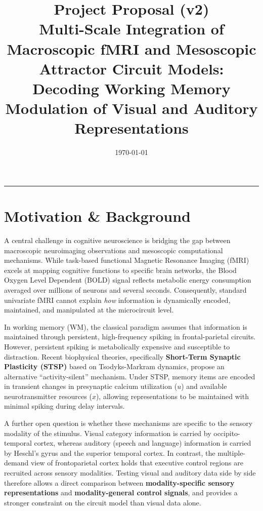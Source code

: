\documentclass[11pt,a4paper]{article}
\title{\textbf{Project Proposal (v2)}\\[0.5em] 
\Large Multi-Scale Integration of Macroscopic fMRI and Mesoscopic Attractor Circuit Models: Decoding Working Memory Modulation of Visual and Auditory Representations}
\author{}
\date{\today}
\begin{document}
\maketitle

\hrule
\vspace{1em}

\section{Motivation \& Background}

A central challenge in cognitive neuroscience is bridging the gap between macroscopic neuroimaging observations and mesoscopic computational mechanisms. While task-based functional Magnetic Resonance Imaging (fMRI) excels at mapping cognitive functions to specific brain networks, the Blood Oxygen Level Dependent (BOLD) signal reflects metabolic energy consumption averaged over millions of neurons and several seconds. Consequently, standard univariate fMRI cannot explain \textit{how} information is dynamically encoded, maintained, and manipulated at the microcircuit level.

In working memory (WM), the classical paradigm assumes that information is maintained through persistent, high-frequency spiking in frontal-parietal circuits. However, persistent spiking is metabolically expensive and susceptible to distraction. Recent biophysical theories, specifically \textbf{Short-Term Synaptic Plasticity (STSP)} based on Tsodyks-Markram dynamics, propose an alternative ``activity-silent'' mechanism. Under STSP, memory items are encoded in transient changes in presynaptic calcium utilization ($u$) and available neurotransmitter resources ($x$), allowing representations to be maintained with minimal spiking during delay intervals.

A further open question is whether these mechanisms are specific to the sensory modality of the stimulus. Visual category information is carried by occipito-temporal cortex, whereas auditory (speech and language) information is carried by Heschl's gyrus and the superior temporal cortex. In contrast, the multiple-demand view of frontoparietal cortex holds that executive control regions are recruited across sensory modalities. Testing visual and auditory data side by side therefore allows a direct comparison between \textbf{modality-specific sensory representations} and \textbf{modality-general control signals}, and provides a stronger constraint on the circuit model than visual data alone.
\end{document}
